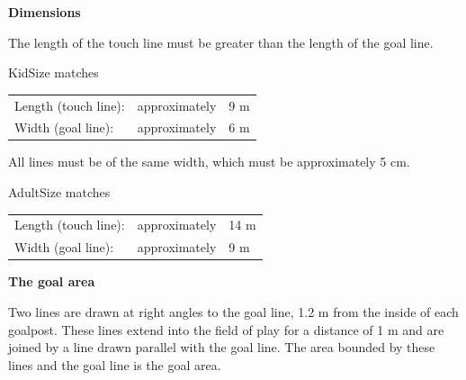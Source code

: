 \bigskip

{\textbf{Dimensions}}

\headlinebox

The length of the touch line must be greater than the length of the goal line. 

\bigskip

KidSize  matches

\begin{tabular}{lll}
Length (touch line): &approximately &9 m \\
Width (goal line): &approximately &6 m
\end{tabular}


\bigskip

All lines must be of the same width, which must be approximately 5 cm. 



\bigskip

AdultSize matches

\begin{tabular}{lll}
Length (touch line): &approximately & 14 m \\ 
Width (goal line): &approximately &9 m\\
\end{tabular}


\bigskip

{\bfseries The goal area }

\headlinebox

Two lines are drawn at right angles to the goal line, 1.2 m from the inside of each goalpost. These lines extend into the field of play for a distance of 1 m and are joined by a line drawn parallel with the goal line. The area bounded by these lines and the goal line is the goal area. 

